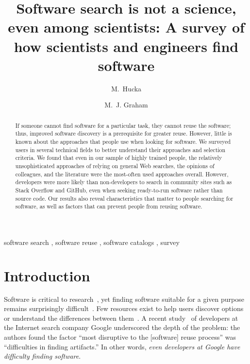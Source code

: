 \documentclass[review]{elsarticle}
\begin{document}
\begin{frontmatter}

\title{Software search is not a science, even among scientists: A survey of how scientists and engineers find software}

\author[cms]{M.~Hucka}
\author[astro]{M.~J. Graham}

\address[cms]{Department of Computing and Mathematical Sciences, California Institute of Technology, Pasadena, California 91125, USA}

\address[astro]{Department of Astronomy, California Institute of Technology, Pasadena, California 91125, USA}

\begin{abstract}
  If someone cannot find software for a particular task, they cannot reuse the software; thus, improved software discovery is a prerequisite for greater reuse.  However, little is known about the approaches that people use when looking for software.  We surveyed users in several technical fields to better understand their approaches and selection criteria.  We found that even in our sample of highly trained people, the relatively unsophisticated approaches of relying on general Web searches, the opinions of colleagues, and the literature were the most-often used approaches overall.  However, developers were more likely than non-developers to search in community sites such as Stack Overflow and GitHub, even when seeking ready-to-run software rather than source code.  Our results also reveal characteristics that matter to people searching for software, as well as factors that can prevent people from reusing software.
\end{abstract}

\begin{keyword}
software search \sep
software reuse \sep
software catalogs \sep
survey
\end{keyword}

\end{frontmatter}


\section{Introduction}

Software is critical to research~\citep{stewart2013initial, howison2015software, howison2015understanding, ince2012case, morin_2012, hettrick_2014, hannay_2009, wilson_2006, katz2016report, katz2015looking}, yet finding software suitable for a given purpose remains surprisingly difficult~\citep{howison2015software, cannata_2005, Bourne::2015, white2014nih}.  Few resources exist to help users discover options or understand the differences between them~\citep{white2014nih}.  A recent study~\citep{bauer2014exploratory} of developers at the Internet search company Google underscored the depth of the problem: the authors found the factor ``most disruptive to the [software] reuse process'' was ``difficulties in finding artifacts.''  In other words, \emph{even developers at Google have difficulty finding software}.
\end{document}
